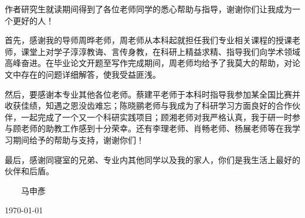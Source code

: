 \begin{thanks}

作者研究生就读期间得到了各位老师同学的悉心帮助与指导，谢谢你们让我成为一个更好的人！

首先，感谢我的导师周晔老师，周老师从本科起就担任我们专业相关课程的授课老师，课堂上对学子淳淳教诲、言传身教，在科研上精益求精、指导我们向学术领域高峰奋进。在毕业论文开题至写作完成期间，周老师均给予了我莫大的帮助，对论文中存在的问题详细解答，使我受益匪浅。

然后，要感谢本专业其他各位老师。蔡建平老师于本科时指导我参加某全国比赛并收获佳绩，知遇之恩没齿难忘；陈晓鹂老师与我成为了科研学习方面良好的合作伙伴，一起完成了一个又一个科研实践项目；顾湘老师对我严格认真，我于研一时参与顾老师的助教工作感到十分荣幸。还有李理老师、肖畅老师、杨展老师等在我学习期间给予的帮助与支持，谢谢你们！

最后，感谢同寝室的兄弟、专业内其他同学以及我的家人，你们是我生活上最好的伙伴和后盾。

\vskip 18pt

\begin{flushright}

~~~~马申彥~~~~

\today

\end{flushright}

\end{thanks}
